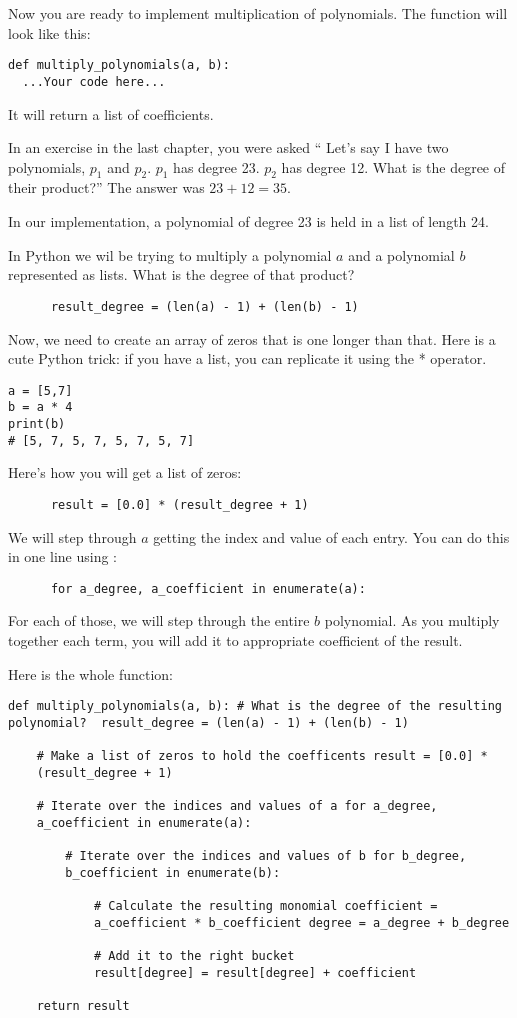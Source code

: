 Now you are ready to implement multiplication of polynomials. The function will look like this:
\begin{Verbatim}
def multiply_polynomials(a, b):
  ...Your code here...
\end{Verbatim}
It will return a list of coefficients.

In an exercise in the last chapter, you were asked `` Let's say I have
two polynomials, $p_1$ and $p_2$.  $p_1$ has degree 23.  $p_2$ has
degree 12.  What is the degree of their product?'' The answer was $23 +
12 = 35$.

In our implementation, a polynomial of degree 23 is held in a list of length 24.

In Python we wil be trying to multiply a polynomial $a$ and a
polynomial $b$ represented as lists. What is the degree of that product?
\begin{Verbatim}
      result_degree = (len(a) - 1) + (len(b) - 1)
\end{Verbatim}

Now, we need to create an array of zeros that is one longer than that. Here is a cute Python trick: if you have a list, you can replicate it using the * operator. 
\begin{Verbatim}
a = [5,7]
b = a * 4
print(b)
# [5, 7, 5, 7, 5, 7, 5, 7]
\end{Verbatim}

Here's how you will get a list of zeros:
\begin{Verbatim}
      result = [0.0] * (result_degree + 1)
\end{Verbatim}

We will step through $a$ getting the index and value of each entry. You can do this in one line using :
\begin{Verbatim}
      for a_degree, a_coefficient in enumerate(a):
\end{Verbatim}
For each of those, we will step through the entire $b$ polynomial. As
you multiply together each term, you will add it to appropriate
coefficient of the result.

Here is the whole function:
\begin{Verbatim}
def multiply_polynomials(a, b): # What is the degree of the resulting
polynomial?  result_degree = (len(a) - 1) + (len(b) - 1)

    # Make a list of zeros to hold the coefficents result = [0.0] *
    (result_degree + 1)

    # Iterate over the indices and values of a for a_degree,
    a_coefficient in enumerate(a):

        # Iterate over the indices and values of b for b_degree,
        b_coefficient in enumerate(b):

            # Calculate the resulting monomial coefficient =
            a_coefficient * b_coefficient degree = a_degree + b_degree
            
            # Add it to the right bucket
            result[degree] = result[degree] + coefficient
            
    return result
\end{Verbatim}


